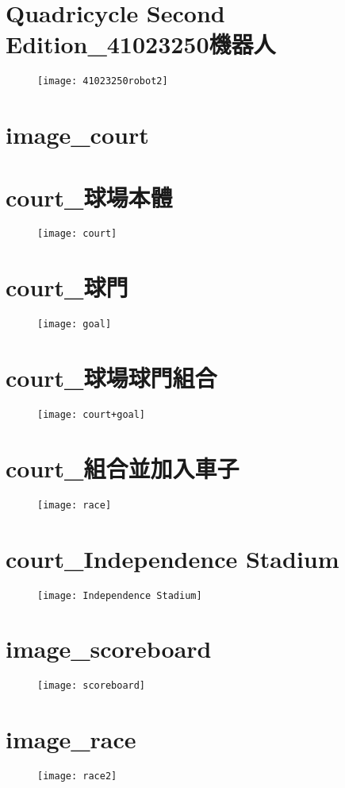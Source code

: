 \section{Quadricycle Second Edition\_41023250機器人}
\begin{figure}
\texttt{[image: 41023250robot2]}
\end{figure}
\section{image\_court}
\section{court\_球場本體}
\begin{figure}
\texttt{[image: court]}
\end{figure}
\section{court\_球門}
\begin{figure}
\texttt{[image: goal]}
\end{figure}
\section{court\_球場球門組合}
\begin{figure}
\texttt{[image: court+goal]}
\end{figure}
\section{court\_組合並加入車子}
\begin{figure}
\texttt{[image: race]}
\end{figure}
\section{court\_Independence Stadium}
\begin{figure}
\texttt{[image: Independence Stadium]}
\end{figure}
\section{image\_scoreboard}
\begin{figure}
\texttt{[image: scoreboard]}
\end{figure}
\section{image\_race}
\begin{figure}
\texttt{[image: race2]}
\end{figure}


